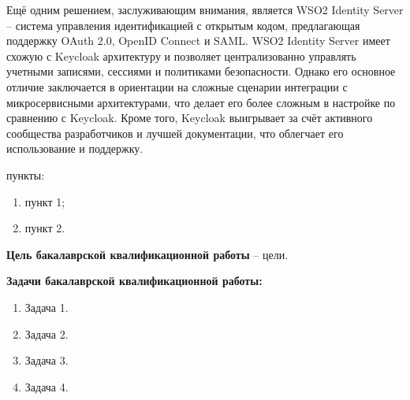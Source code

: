 Ещё одним решением, заслуживающим внимания, является WSO2 Identity Server – система управления идентификацией с открытым кодом, предлагающая поддержку OAuth 2.0, OpenID Connect и SAML. WSO2 Identity Server имеет схожую с Keycloak архитектуру и позволяет централизованно управлять учетными записями, сессиями и политиками безопасности. Однако его основное отличие заключается в ориентации на сложные сценарии интеграции с микросервисными архитектурами, что делает его более сложным в настройке по сравнению с Keycloak. Кроме того, Keycloak выигрывает за счёт активного сообщества разработчиков и лучшей документации, что облегчает его использование и поддержку.

пункты:
\begin{enumerate}
\item пункт 1;
\item пункт 2.
\end{enumerate}

\newpage

\textbf{Цель бакалаврской квалификационной работы} -- цели.

\textbf{Задачи бакалаврской квалификационной работы:}
\begin{enumerate}
\item Задача 1. 
\item Задача 2.
\item Задача 3.
\item Задача 4. 
\end{enumerate}

